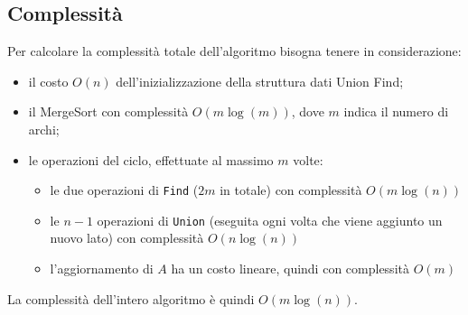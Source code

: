	\subsection{Complessità}
		Per calcolare la complessità totale dell'algoritmo bisogna tenere in considerazione:
		\begin{itemize}
			\item il costo $O(n)$ dell'inizializzazione della struttura dati Union Find;
			\item il MergeSort con complessità $O(m\log(m))$, dove $m$ indica il numero di archi;
			\item le operazioni del ciclo, effettuate al massimo $m$ volte:
			\begin{itemize}
				\item le due operazioni di \texttt{Find} ($2m$ in totale) con complessità $O(m\log(n))$
				\item le $n-1$ operazioni di \texttt{Union} (eseguita ogni volta che viene aggiunto un nuovo lato) con complessità $O(n \log(n))$
				\item l'aggiornamento di $A$ ha un costo lineare, quindi con complessità $O(m)$
			\end{itemize}
		\end{itemize}
		La complessità dell'intero algoritmo è quindi $O(m\log(n))$.

\pagebreak
